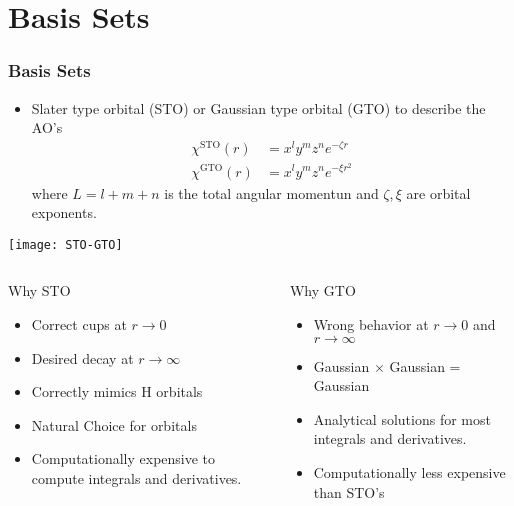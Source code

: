 \documentclass[slidestop,mathserif,compress,xcolor=svgnames]{beamer}
\begin{document}
\section{Basis Sets}
\begin{frame}
\frametitle{\small Basis Sets}
\footnotesize{
\begin{itemize}
\item %
Slater type orbital (STO) or Gaussian type orbital (GTO) to describe the AO's
\begin{align*}
\chi^{\mathrm{STO}}(r) &= x^ly^mz^ne^{-\zeta r}\\
\chi^{\mathrm{GTO}}(r) &= x^ly^mz^ne^{-\xi r^2}
\end{align*}
where $L=l+m+n$ is the total angular momentun and $\zeta,\xi$ are orbital exponents. 
\end{itemize}
\begin{center}
\texttt{[image: STO-GTO]}
\end{center}
\begin{columns}
\column{5.5cm}
\vspace{-0.2cm}
\begin{block}{Why STO}
\begin{itemize}
\item Correct cups at $r\rightarrow0$
\item Desired decay at $r\rightarrow\infty$ 
\item Correctly mimics H orbitals
\item Natural Choice for orbitals
\item Computationally expensive to compute integrals and derivatives.
\end{itemize}
\end{block}
\column{5.5cm}
\vspace{-0.2cm}
\begin{block}{Why GTO}
\begin{itemize}
\item Wrong behavior at $r\rightarrow0$ and $r\rightarrow\infty$
\item Gaussian $\times$ Gaussian = Gaussian
\item Analytical solutions for most integrals and derivatives.
\item Computationally less expensive than STO's
\end{itemize}
\end{block}
\end{columns}

}
\end{frame}
\end{document}
